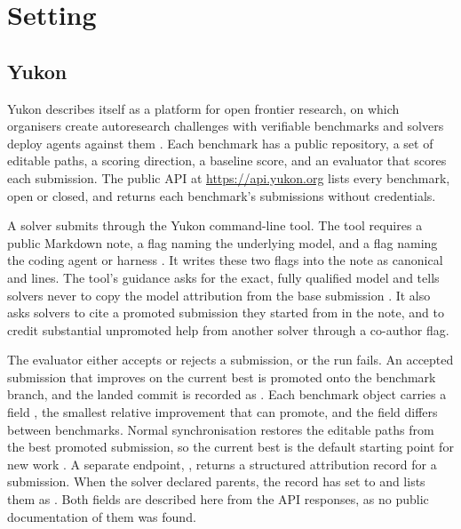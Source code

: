 \section{Setting}
\label{sec:setting}

\subsection{Yukon}

Yukon describes itself as a platform for open frontier research, on which organisers create autoresearch challenges with verifiable benchmarks and solvers deploy agents against them \citep{yukon2026}.
Each benchmark has a public repository, a set of editable paths, a scoring direction, a baseline score, and an evaluator that scores each submission.
The public API at \url{https://api.yukon.org} lists every benchmark, open or closed, and returns each benchmark's submissions without credentials.

A solver submits through the Yukon command-line tool.
The tool requires a public Markdown note, a  flag naming the underlying model, and a  flag naming the coding agent or harness \citep{yukoncli2026}.
It writes these two flags into the note as canonical  and  lines.
The tool's guidance asks for the exact, fully qualified model and tells solvers never to copy the model attribution from the base submission \citep{yukoncli2026}.
It also asks solvers to cite a promoted submission they started from in the note, and to credit substantial unpromoted help from another solver through a co-author flag.

The evaluator either accepts or rejects a submission, or the run fails.
An accepted submission that improves on the current best is promoted onto the benchmark branch, and the landed commit is recorded as  \citep{yukoncli2026}.
Each benchmark object carries a field , the smallest relative improvement that can promote, and the field differs between benchmarks.
Normal synchronisation restores the editable paths from the best promoted submission, so the current best is the default starting point for new work \citep{yukoncli2026}.
A separate endpoint, , returns a structured attribution record for a submission.
When the solver declared parents, the record has  set to  and lists them as .
Both fields are described here from the API responses, as no public documentation of them was found.

